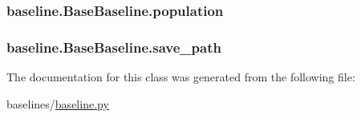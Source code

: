 \subsubsection[{\texorpdfstring{population}{population}}]{\setlength{\rightskip}{0pt plus 5cm}baseline.\+Base\+Baseline.\+population}\hypertarget{classbaseline_1_1_base_baseline_a4ba25bf5a661ce06ced3040dc0a5df9b}{}\label{classbaseline_1_1_base_baseline_a4ba25bf5a661ce06ced3040dc0a5df9b}
\subsubsection[{\texorpdfstring{save\+\_\+path}{save_path}}]{\setlength{\rightskip}{0pt plus 5cm}baseline.\+Base\+Baseline.\+save\+\_\+path}\hypertarget{classbaseline_1_1_base_baseline_a36559a4e95820ade0b95a175f0b39a2b}{}\label{classbaseline_1_1_base_baseline_a36559a4e95820ade0b95a175f0b39a2b}


The documentation for this class was generated from the following file\+:\begin{DoxyCompactItemize}
\item 
baselines/\hyperlink{baseline_8py}{baseline.\+py}\end{DoxyCompactItemize}
